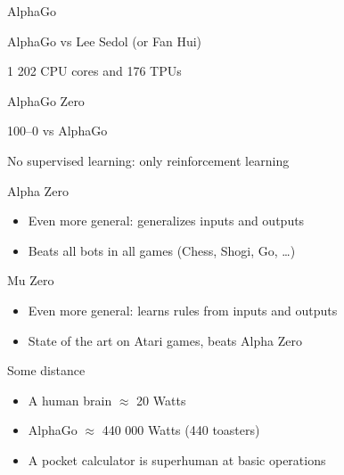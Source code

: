 \begin{frame}{AlphaGo}
  \begin{center}
    AlphaGo vs Lee Sedol (or Fan Hui)
  \end{center}
  \huge
  1 202 CPU cores and 176 TPUs
\end{frame}

\begin{frame}{AlphaGo Zero}
  \begin{description}[<+->]
    \item[Stronger] 100--0 vs AlphaGo
    \item[More general] No supervised learning: only reinforcement learning
  \end{description}

\end{frame}

\begin{frame}{Alpha Zero}
  \begin{itemize}[<+->]
    \item Even more general: generalizes inputs and outputs
    \item Beats all bots in all games (Chess, Shogi, Go, …)
  \end{itemize}  
\end{frame}

\begin{frame}{Mu Zero}
  \begin{itemize}[<+->]
    \item Even more general: learns rules from inputs and outputs
    \item State of the art on Atari games, beats Alpha Zero
  \end{itemize}
\end{frame}

\begin{frame}{Some distance}
  \begin{itemize}[<+->]
    \item A human brain $\approx$ 20 Watts
    \item AlphaGo $\approx$ 440 000 Watts (440 toasters)
    \item A pocket calculator is superhuman at basic operations
  \end{itemize}
\end{frame}
